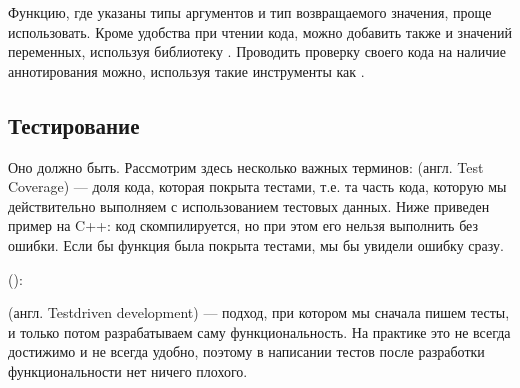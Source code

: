 \documentclass[letterpaper,10pt,russian]{sphinxmanual}
\begin{document}
\sphinxAtStartPar
Функцию, где указаны типы аргументов и тип возвращаемого значения, проще использовать. Кроме удобства при чтении кода, можно добавить также и  значений переменных, используя библиотеку . Проводить проверку своего кода на наличие аннотирования можно, используя такие инструменты как .


\subsection{Тестирование}
\label{\detokenize{educational_materials/terms/content:id4}}
\sphinxAtStartPar
Оно должно быть. Рассмотрим здесь несколько важных терминов:  (англ. Test Coverage) — доля кода, которая покрыта тестами, т.е. та часть кода, которую мы действительно выполняем с использованием тестовых данных. Ниже приведен пример на C++: код скомпилируется, но при этом его нельзя выполнить без ошибки. Если бы функция  была покрыта тестами, мы бы увидели ошибку сразу.

\sphinxAtStartPar
():

\begin{sphinxVerbatim}[commandchars=\\\{\}]


\end{sphinxVerbatim}

\sphinxAtStartPar
{} (англ. Test\sphinxhyphen{}driven development) — подход, при котором мы сначала пишем тесты, и только потом разрабатываем саму функциональность. На практике это не всегда достижимо и не всегда удобно, поэтому в написании тестов после разработки функциональности нет ничего плохого.
\end{document}
